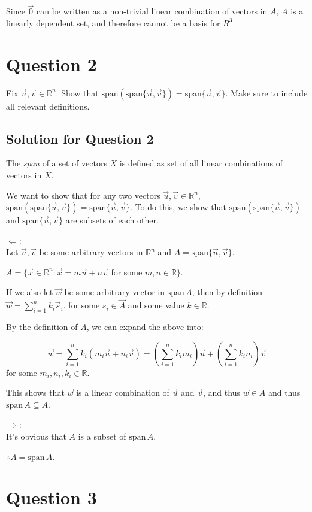 \documentclass[letter]{article}
\newcommand{\R}{\mathbb{R}}
\newcommand{\Span}{\mathrm{span}}
\begin{document}
Since $\vec 0$ can be written as a non-trivial linear combination of vectors in $A$, $A$ is a linearly dependent set, and therefore cannot be a basis for $R^3$.

\section{Question 2}

Fix $\vec u,\vec v\in \R^n$.  Show that $\Span(\Span\{\vec u,\vec v\})=\Span\{\vec u,\vec v\}$.
      Make sure to include all relevant definitions.

\subsection{Solution for Question 2}

    The \emph{span} of a set of vectors $X$ is defined as set of all linear combinations of vectors in $X$.

    We want to show that for any two vectors $\vec u,\vec v\in \R^n$,
        $\Span(\Span\{\vec u,\vec v\})=\Span\{\vec u,\vec v\}$. To do this, we show that $\Span(\Span\{\vec u,\vec v\})$ and $\Span\{\vec u,\vec v\}$ are subsets of each other.

    $\Leftarrow$:\\
    Let $\vec u,\vec v$ be some arbitrary vectors in $\R^n$ and $A=\Span\{\vec u,\vec v\}$.

  $A=\{\vec x\in\R^n:\vec x=m\vec u+n\vec v$ for some $m,n\in \R\}$.

    If we also let $\vec w$ be some arbitrary vector in $\Span\,A$, then by definition
    $\vec w=\sum_{i=1}^n k_i\vec s_i$. for some $s_i \in \vec A$ and some value $k \in \R$.

    By the definition of $A$, we can expand the above into:

    \[
        \vec w =\sum_{i=1}^n k_i (m_i\vec u+n_i\vec v)=
        (\sum_{i=1}^n k_i m_i)\vec u+
        (\sum_{i=1}^n k_i n_i)\vec v
    \]
        for some $m_i,n_i,k_i\in \R$.

        This shows that $\vec w$ is a linear combination of $\vec u$ and $\vec v$, and thus $\vec w \in A$
        and thus $\Span\, A\subseteq A$.

    $\Rightarrow$:\\
    It's obvious that $A$ is a subset of $\Span\,A$.


    $\therefore A=\Span\,A$.

\section{Question 3}
\end{document}
